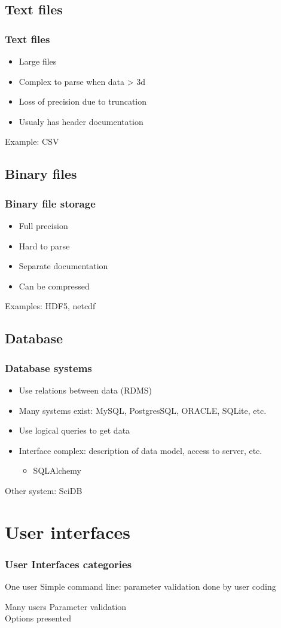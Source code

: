 \documentclass[14pt]{beamer}
\begin{document}
\subsection{Text files}
\begin{frame}
\frametitle{Text files}
\begin{itemize}
\item Large files
\item Complex to parse when data > 3d
\item Loss of precision due to truncation
\item Usualy has header documentation 
\end{itemize}
Example: CSV
\end{frame}

\subsection{Binary files}
\begin{frame}
\frametitle{Binary file storage}
\begin{itemize}
\item Full precision
\item Hard to parse
\item Separate documentation
\item Can be compressed
\end{itemize}
Examples: HDF5, netcdf
\end{frame}

\subsection{Database}
\begin{frame}
\frametitle{Database systems}
\begin{itemize}
\item Use relations between data (RDMS)
\item Many systems exist: MySQL, PostgresSQL, ORACLE, SQLite, etc.
\item Use logical queries to get data
\item Interface complex: description of data model, access to server, etc.
\begin{itemize}
\item SQLAlchemy
\end{itemize}
\end{itemize}
Other system: SciDB
\end{frame}


\section{User interfaces}
\begin{frame}
\frametitle{User Interfaces categories}
\begin{block}{One user}
Simple command line: parameter validation done by user coding
\end{block}
\begin{block}{Many users}
Parameter validation\\
Options presented
\end{block}
\end{frame}
\end{document}
